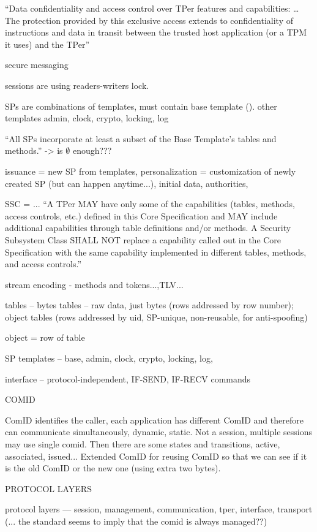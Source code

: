\documentclass[
  digital, %
  oneside, %
  nolof,     %
  nolot,     %
]{fithesis4}
\begin{document}
``Data confidentiality and access control over TPer features and capabilities: \dots The protection provided by this
exclusive access extends to confidentiality of instructions and data in transit between the
trusted host application (or a TPM it uses) and the TPer''


secure messaging

sessions are using readers-writers lock.

SPs are combinations of templates, must contain base template (). other templates admin, clock, crypto, locking, log

``All SPs incorporate at least a subset of the Base Template’s tables and methods.'' -> is $\emptyset$ enough???

issuance = new SP from templates, personalization = customization of newly created SP (but can happen anytime...), initial data, authorities, 

SSC = ... ``A TPer MAY have only some of the capabilities (tables, methods, access controls, etc.) defined in this
Core Specification and MAY include additional capabilities through table definitions and/or methods. A
Security Subsystem Class SHALL NOT replace a capability called out in the Core Specification with the
same capability implemented in different tables, methods, and access controls.''

stream encoding - methods and tokens...,TLV...

tables -- bytes tables -- raw data, just bytes (rows addressed by row number); object tables (rows addressed by uid, SP-unique, non-reusable, for anti-spoofing)

object = row of table

SP templates -- base, admin, clock, crypto, locking, log,


interface -- protocol-independent, IF-SEND, IF-RECV commands 


COMID

ComID identifies the caller, each application has different ComID and therefore can communicate simultaneously, dynamic, static. Not a session, multiple sessions may use single comid. Then there are some states and transitions, active, associated, issued... Extended ComID for reusing ComID so that we can see if it is the old ComID or the new one (using extra two bytes).

PROTOCOL LAYERS

protocol layers --- session, management, communication, tper, interface, transport  
(... the standard seems to imply that the comid is always managed??)
\end{document}
